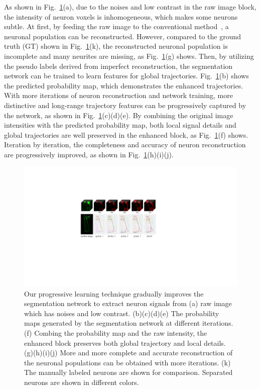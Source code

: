 As shown in Fig.~\ref{fig:ngps}(a), due to the noises and low contrast in the raw image block, the intensity of neuron voxels is inhomogeneous, which makes some neurons subtle.
At first, by feeding the raw image to the conventional method~\cite{Quan2015}, a neuronal population can be reconstructed. However, compared to the ground truth (GT) shown in Fig.~\ref{fig:ngps}(k), the reconstructed neuronal population is incomplete and many neurites are missing, as Fig.~\ref{fig:ngps}(g) shows.
Then, by utilizing the pseudo labels derived from imperfect reconstruction, the segmentation network can be trained to learn features for global trajectories. Fig.~\ref{fig:ngps}(b) shows the predicted probability map, which demonstrates the enhanced trajectories.
With more iterations of neuron reconstruction and network training, more distinctive and long-range trajectory features can be progressively captured by the network, as shown in Fig.~\ref{fig:ngps}(c)(d)(e).
By combining the original image intensities with the predicted probability map, both local signal details and global trajectories are well preserved in the enhanced block, as Fig.~\ref{fig:ngps}(f) shows.
Iteration by iteration, the completeness and accuracy of neuron reconstruction are progressively improved, as shown in Fig.~\ref{fig:ngps}(h)(i)(j).


\begin{figure}[t]
	\centering
	\includegraphics[width=1\columnwidth]{./Illustrations/ngps.pdf}
	\caption{
		Our progressive learning technique gradually improves the segmentation network to extract neuron signals from (a) raw image which has noises and low contrast. (b)(c)(d)(e) The probability maps generated by the segmentation network at different iterations. (f) Combing the probability map and the raw intensity, the enhanced block preserves both global trajectory and local details. (g)(h)(i)(j) More and more complete and accurate reconstruction of the neuronal populations can be obtained with more iterations. (k) The manually labeled neurons are shown for comparison. Separated neurons are shown in different colors.}
	\label{fig:ngps}
\end{figure}
%

